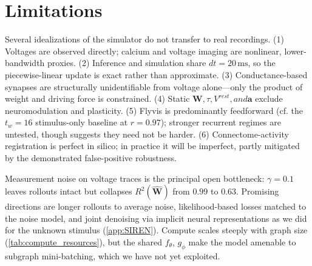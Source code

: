 \documentclass{article}
\begin{document}




\section{Limitations}

Several idealizations of the simulator do not transfer to real recordings. (1) Voltages are observed directly; calcium and voltage imaging are nonlinear, lower-bandwidth proxies. (2) Inference and simulation share $dt = 20\,\text{ms}$, so the piecewise-linear update is exact rather than approximate. (3) Conductance-based synapses are structurally unidentifiable from voltage alone---only the product of weight and driving force is constrained. (4) Static $\mathbf{W}, \tau, V^{rest}, and \mathbf{a}$ exclude neuromodulation and plasticity. (5) Flyvis is predominantly feedforward (cf. the $t_w=16$ stimulus-only baseline at $r=0.97$); stronger recurrent regimes are untested, though \citet{allier_graph_2026} suggests they need not be harder. (6) Connectome-activity registration is perfect in silico; in practice it will be imperfect, partly mitigated by the demonstrated false-positive robustness.

Measurement noise on voltage traces is the principal open bottleneck: $\gamma = 0.1$ leaves rollouts intact but collapses $R^2(\hat{\mathbf{W}})$ from $0.99$ to $0.63$. Promising directions are longer rollouts to average noise, likelihood-based losses matched to the noise model, and joint denoising via implicit neural representations as we did for the unknown stimulus (\cref{app:SIREN}). Compute scales steeply with graph size (\cref{tab:compute_resources}), but the shared $f_\theta$, $g_\phi$ make the model amenable to subgraph mini-batching, which we have not yet exploited.

\end{document}

